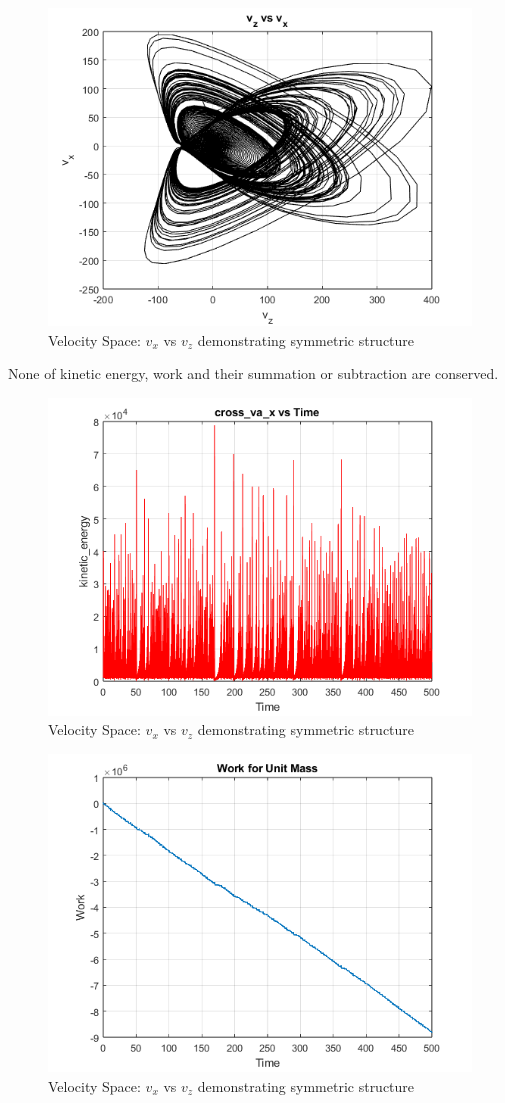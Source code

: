 \documentclass[%
reprint,
amsmath,amssymb,
aps,
floatfix,
]{revtex4-2}
\begin{document}
	\begin{figure}[htbp]
		\centering
		\includegraphics[width=0.8\linewidth]{vx_vs_vz.png}
		\caption{Velocity Space: $v_x$ vs $v_z$ demonstrating symmetric structure}
		\label{fig:vx_vz}
	\end{figure}	
	None of kinetic energy, work and their summation or subtraction are conserved.
	\begin{figure}[htbp]
		\centering
		\includegraphics[width=0.8\linewidth]{kinetic_energy_plot.png}
		\caption{Velocity Space: $v_x$ vs $v_z$ demonstrating symmetric structure}
		\label{fig:vx_vz}
	\end{figure}
	\begin{figure}[htbp]
		\centering
		\includegraphics[width=0.8\linewidth]{work.png}
		\caption{Velocity Space: $v_x$ vs $v_z$ demonstrating symmetric structure}
		\label{fig:vx_vz}
	\end{figure}
\end{document}
